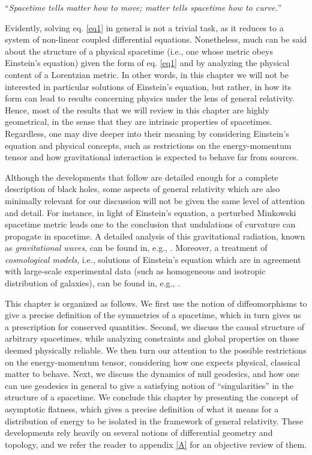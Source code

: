 \documentclass[
12pt,		%
openright,	%
twoside,  %
a4paper,			%
chapter=TITLE,		%
english,			%
french,				%
spanish,			%
brazil				%
]{USPSC-classe/USPSC}
\begin{document}
\noindent``\textit{Spacetime tells matter how to move; matter tells
spacetime how to curve.}''

Evidently, solving eq. \ref{eq1} in general is not a trivial task, as it reduces to a system of non-linear coupled differential equations. Nonetheless, much can be said about the structure of a physical spacetime (i.e., one whose metric obeys Einstein's equation) given the form of eq. \ref{eq1} and by analyzing the physical content of a Lorentzian metric. In other words, in this chapter we will not be interested in particular solutions of Einstein's equation, but rather, in how its form can lead to results concerning physics under the lens of general relativity. Hence, most of the results that we will review in this chapter are highly geometrical, in the sense that they are intrinsic properties of spacetimes. Regardless, one may dive deeper into their meaning by considering Einstein's equation and physical concepts, such as restrictions on the energy-momentum tensor and how gravitational interaction is expected to behave far from sources.

Although the developments that follow are detailed enough for a complete description of black holes, some aspects of general relativity which are also minimally relevant for our discussion will not be given the same level of attention and detail. For instance, in light of Einstein's equation, a perturbed Minkowski spacetime metric leads one to the conclusion that undulations of curvature can propagate in spacetime. A detailed analysis of this gravitational radiation, known as \textit{gravitational waves}, can be found in, e.g., \cite{Wald1984}. Moreover, a treatment of \textit{cosmological models}, i.e., solutions of Einstein's equation which are in agreement with large-scale experimental data (such as homogeneous and isotropic distribution of galaxies), can be found in, e.g., \cite{Wald1984}.

This chapter is organized as follows. We first use the notion of diffeomorphisms to give a precise definition of the symmetries of a spacetime, which in turn gives us a prescription for conserved quantities. Second, we discuss the causal structure of arbitrary spacetimes, while analyzing constraints and global properties on those deemed physically reliable. We then turn our attention to the possible restrictions on the energy-momentum tensor, considering how one expects physical, classical matter to behave. Next, we discuss the dynamics of null geodesics, and how one can use geodesics in general to give a satisfying notion of ``singularities'' in the structure of a spacetime. We conclude this chapter by presenting the concept of asymptotic flatness, which gives a precise definition of what it means for a distribution of energy to be isolated in the framework of general relativity. These developments rely heavily on several notions of differential geometry and topology, and we refer the reader to appendix \ref{A} for an objective review of them. 
\end{document}

